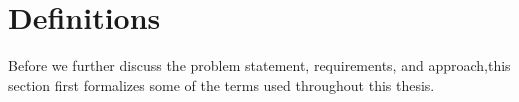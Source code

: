 

\section{Definitions}
\label{sec:introDefinition}

Before we further discuss the problem statement, requirements, and approach,this section first formalizes some of the terms used throughout this thesis.

